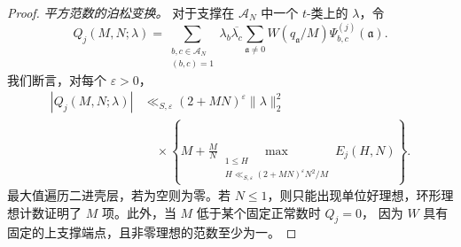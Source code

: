 \documentclass[11pt,a4paper]{article}
\numberwithin{equation}{section}
\numberwithin{figure}{section}
\theoremstyle{definition}
\theoremstyle{remark}
\begin{document}
\begin{proof}
\medskip\noindent\emph{平方范数的泊松变换。}
对于支撑在 $\mathcal A_N$ 中一个 $t$-类上的 $\lambda$，令
\[
 Q_j(M,N;\lambda)=
 \sum_{\substack{b,c\in\mathcal A_N\\(b,c)=1}}
   \lambda_b\overline{\lambda_c}
   \sum_{\mathfrak a\ne0}W(q_{\mathfrak a}/M)
                         \Psi_{b,c}^{(j)}(\mathfrak a).
\]
我们断言，对每个 $\varepsilon>0$，
\begin{equation}\label{eq:sextic-sieve-pair-norm}
 \begin{split}
 |Q_j(M,N;\lambda)|
 &\ll_{S,\varepsilon}(2+MN)^\varepsilon\|\lambda\|_2^2\\
 &\quad\times
 \left\{M+\frac MN
   \max_{\substack{1\le H\\
       H\ll_{S,\varepsilon}(2+MN)^\varepsilon N^2/M}}
       E_j(H,N)\right\}.
 \end{split}
\end{equation}
最大值遍历二进壳层，若为空则为零。若 $N\le1$，则只能出现单位好理想，环形理想计数证明了
$M$ 项。此外，当 $M$ 低于某个固定正常数时 $Q_j=0$，
因为 $W$ 具有固定的上支撑端点，且非零理想的范数至少为一。


\end{proof}
\end{document}
